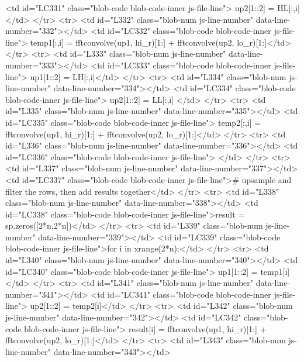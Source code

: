         <td id="LC331" class="blob-code blob-code-inner js-file-line">	up2[1::2] = HL[:,i]</td>
      </tr>
      <tr>
        <td id="L332" class="blob-num js-line-number" data-line-number="332"></td>
        <td id="LC332" class="blob-code blob-code-inner js-file-line">	temp1[:,i] = fftconvolve(up1, hi_r)[1:] + fftconvolve(up2, lo_r)[1:]</td>
      </tr>
      <tr>
        <td id="L333" class="blob-num js-line-number" data-line-number="333"></td>
        <td id="LC333" class="blob-code blob-code-inner js-file-line">	up1[1::2] = LH[:,i]</td>
      </tr>
      <tr>
        <td id="L334" class="blob-num js-line-number" data-line-number="334"></td>
        <td id="LC334" class="blob-code blob-code-inner js-file-line">	up2[1::2] = LL[:,i]		</td>
      </tr>
      <tr>
        <td id="L335" class="blob-num js-line-number" data-line-number="335"></td>
        <td id="LC335" class="blob-code blob-code-inner js-file-line">	temp2[:,i] = fftconvolve(up1, hi_r)[1:] + fftconvolve(up2, lo_r)[1:]</td>
      </tr>
      <tr>
        <td id="L336" class="blob-num js-line-number" data-line-number="336"></td>
        <td id="LC336" class="blob-code blob-code-inner js-file-line">
</td>
      </tr>
      <tr>
        <td id="L337" class="blob-num js-line-number" data-line-number="337"></td>
        <td id="LC337" class="blob-code blob-code-inner js-file-line"># upsample and filter the rows, then add results together</td>
      </tr>
      <tr>
        <td id="L338" class="blob-num js-line-number" data-line-number="338"></td>
        <td id="LC338" class="blob-code blob-code-inner js-file-line">result = sp.zeros([2*n,2*n])</td>
      </tr>
      <tr>
        <td id="L339" class="blob-num js-line-number" data-line-number="339"></td>
        <td id="LC339" class="blob-code blob-code-inner js-file-line">for i in xrange(2*n):</td>
      </tr>
      <tr>
        <td id="L340" class="blob-num js-line-number" data-line-number="340"></td>
        <td id="LC340" class="blob-code blob-code-inner js-file-line">	up1[1::2] = temp1[i]</td>
      </tr>
      <tr>
        <td id="L341" class="blob-num js-line-number" data-line-number="341"></td>
        <td id="LC341" class="blob-code blob-code-inner js-file-line">	up2[1::2] = temp2[i]</td>
      </tr>
      <tr>
        <td id="L342" class="blob-num js-line-number" data-line-number="342"></td>
        <td id="LC342" class="blob-code blob-code-inner js-file-line">	result[i] = fftconvolve(up1, hi_r)[1:] + fftconvolve(up2, lo_r)[1:]</td>
      </tr>
      <tr>
        <td id="L343" class="blob-num js-line-number" data-line-number="343"></td>
